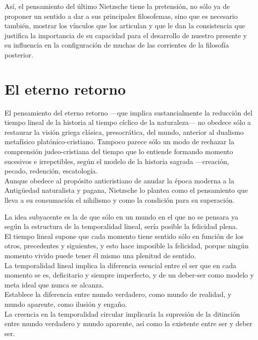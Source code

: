 \documentclass[a4paper, 10pt, twocolumn, spanish]{article}
\begin{document}
Así, el pensamiento del último Nietzsche tiene la pretensión, no sólo
ya de proponer un sentido a dar a sus principales filosofemas, sino
que es necesario también, mostrar los vínculos que los articulan y que
le dan la consistencia que justifica la importancia de su capacidad
para el desarrollo de nuestro presente y su influencia en la
configuración de muchas de las corrientes de la filosofía posterior.

\section{El eterno retorno}
\label{sec:orgc99d1e0}
El pensamiento del eterno retorno —que implica sustancialmente la
reducción del tiempo lineal de la historia al tiempo cíclico de la
naturaleza— no obedece sólo a restaurar la visión griega clásica,
presocrática, del mundo, anterior al dualismo metafísico
platónico-cristiano. Tampoco parece sólo un modo de rechazar la
comprensión judeo-cristiana del tiempo que lo entiende formando
momento sucesivos e irrepetibles, según el modelo de la historia
sagrada —creación, pecado, redención, escatología.\\[0pt]
Aunque obedece al propósito anticristiano de anudar la época moderna a
la Antigüedad naturalista y pagana, Nietzsche lo plantea como el
pensamiento que lleva a su consumación el nihilismo y como la
condición para su superación.

La idea subyacente es la de que sólo en un mundo en el que no se
pensara ya según la estructura de la temporalidad lineal, sería
posible la felicidad plena.\\[0pt]
El tiempo lineal supone que cada momento tiene sentido sólo en función
de los otros, precedentes y siguientes, y esto hace imposible la
felicidad, porque ningún momento vivido puede tener él mismo una
plenitud de sentido.\\[0pt]

La temporalidad lineal implica la diferencia esencial entre el ser que
en cada momento se es, deficitario y siempre imperfecto, y de un
deber-ser como modelo y meta ideal que nunca se alcanza.\\[0pt]
Establece la diferencia entre mundo verdadero, como mundo de realidad,
y mundo aparente, como ilusión y engaño.\\[0pt]

La creencia en la temporalidad circular implicaría la supresión de la
ditinción entre mundo verdadero y mundo aparente, así como la
existente entre ser y deber ser.\\[0pt]
\end{document}
